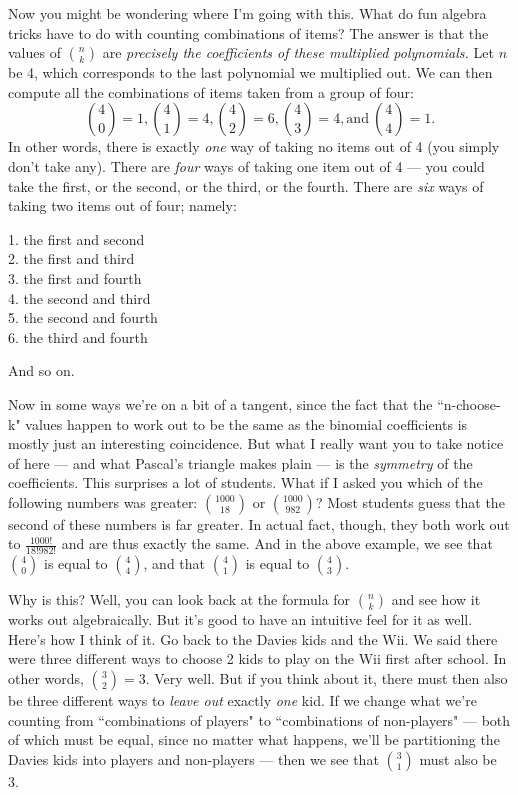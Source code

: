 Now you might be wondering where I'm going with this. What do fun algebra
tricks have to do with counting combinations of items? The answer is that
the values of $\binom{n}{k}$ are \textit{precisely the coefficients of
these multiplied polynomials.} Let $n$ be 4, which corresponds to the last
polynomial we multiplied out. We can then compute all the combinations of
items taken from a group of four:
\[
\binom{4}{0}=1,
\binom{4}{1}=4,
\binom{4}{2}=6,
\binom{4}{3}=4,
\text{and}\ \binom{4}{4}=1.
\]
In other words, there is exactly \textit{one} way of taking no items out of
4 (you simply don't take any). There are \textit{four} ways of taking one
item out of 4 --- you could take the first, or the second, or the third, or
the fourth. There are \textit{six} ways of taking two items out of four;
namely:
\begin{center}
1. the first and second \\
2. the first and third \\
3. the first and fourth \\
4. the second and third \\
5. the second and fourth \\
6. the third and fourth
\end{center}
And so on.

Now in some ways we're on a bit of a tangent, since the fact that the
``n-choose-k" values happen to work out to be the same as the binomial
coefficients is mostly just an interesting coincidence. But what I really
want you to take notice of here --- and what Pascal's triangle makes plain
--- is the \textit{symmetry} of the coefficients. This surprises a lot of
students. What if I asked you which of the following numbers was greater:
$\binom{1000}{18}$ or $\binom{1000}{982}$? Most students guess that the
second of these numbers is far greater. In actual fact, though, they both
work out to $\frac{1000!}{18!982!}$ and are thus exactly the same. And in
the above example, we see that $\binom{4}{0}$ is equal to $\binom{4}{4}$,
and that $\binom{4}{1}$ is equal to $\binom{4}{3}$.

Why is this? Well, you can look back at the formula for $\binom{n}{k}$ and
see how it works out algebraically. But it's good to have an intuitive feel
for it as well. Here's how I think of it. Go back to the Davies kids and
the Wii. We said there were three different ways to choose 2 kids to play
on the Wii first after school. In other words, $\binom{3}{2} = 3.$ Very
well. But if you think about it, there must then also be three different
ways to \textit{leave out} exactly \textit{one} kid. If we change what
we're counting from ``combinations of players" to ``combinations of
non-players" --- both of which must be equal, since no matter what happens,
we'll be partitioning the Davies kids into players and non-players --- then
we see that $\binom{3}{1}$ must also be 3. 

